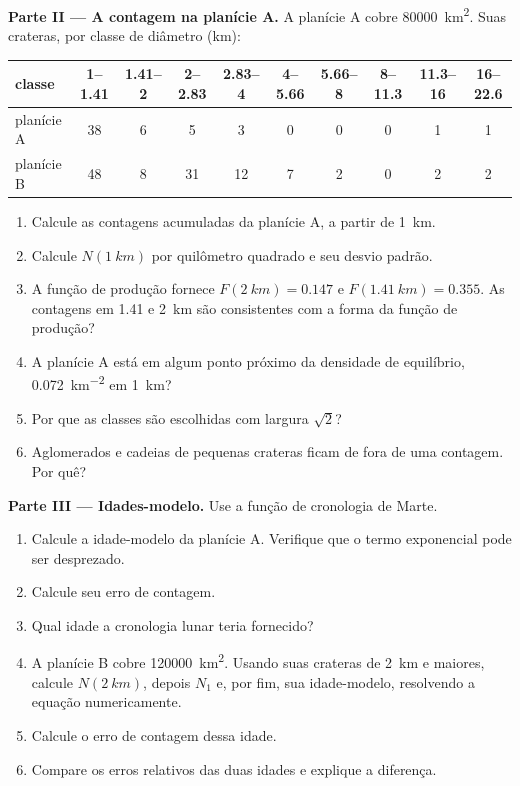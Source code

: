 \begin{problem}
\medskip\noindent\textbf{Parte II --- A contagem na planície A.} A planície A
cobre \qty{80000}{km^2}. Suas crateras, por classe de diâmetro (km):
\begin{center}
\small
\begin{tabular}{lccccccccc}
\hline
classe & 1--1.41 & 1.41--2 & 2--2.83 & 2.83--4 & 4--5.66 & 5.66--8 & 8--11.3 & 11.3--16 & 16--22.6 \\
\hline
planície A & 38 & 6 & 5 & 3 & 0 & 0 & 0 & 1 & 1 \\
planície B & 48 & 8 & 31 & 12 & 7 & 2 & 0 & 2 & 2 \\
\hline
\end{tabular}
\end{center}
\begin{enumerate}[resume]
\item Calcule as contagens acumuladas da planície A, a partir de \qty{1}{km}.
\item Calcule $N(\qty{1}{km})$ por quilômetro quadrado e seu desvio
  padrão.
\item A função de produção fornece $F(\qty{2}{km}) = 0.147$ e
  $F(\qty{1.41}{km}) = 0.355$. As contagens em 1.41 e \qty{2}{km}
  são consistentes com a forma da função de produção?
\item A planície A está em algum ponto próximo da densidade de equilíbrio,
  \qty{0.072}{km^{-2}} em \qty{1}{km}?
\item Por que as classes são escolhidas com largura $\sqrt2$?
\item Aglomerados e cadeias de pequenas crateras ficam de fora de uma contagem. Por quê?
\end{enumerate}

\medskip\noindent\textbf{Parte III --- Idades-modelo.} Use a
função de cronologia de Marte.
\begin{enumerate}[resume]
\item Calcule a idade-modelo da planície A. Verifique que o termo exponencial
  pode ser desprezado.
\item Calcule seu erro de contagem.
\item Qual idade a cronologia lunar teria fornecido?
\item A planície B cobre \qty{120000}{km^2}. Usando suas crateras de \qty{2}{km}
  e maiores, calcule $N(\qty{2}{km})$, depois $N_1$ e, por fim, sua idade-modelo,
  resolvendo a equação numericamente.
\item Calcule o erro de contagem dessa idade.
\item Compare os erros relativos das duas idades e explique a
  diferença.
\end{enumerate}


\end{problem}
